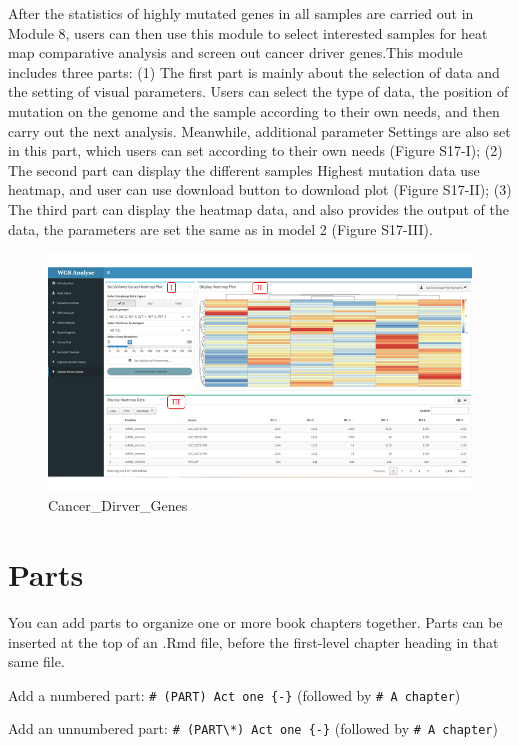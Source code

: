 \documentclass[
]{book}
\theoremstyle{definition}
\theoremstyle{definition}
\theoremstyle{definition}
\theoremstyle{definition}
\theoremstyle{remark}
\begin{document}
After the statistics of highly mutated genes in all samples are carried out in Module 8, users can then use this module to select interested samples for heat map comparative analysis and screen out cancer driver genes.This module includes three parts: (1) The first part is mainly about the selection of data and the setting of visual parameters. Users can select the type of data, the position of mutation on the genome and the sample according to their own needs, and then carry out the next analysis. Meanwhile, additional parameter Settings are also set in this part, which users can set according to their own needs (Figure S17-I); (2) The second part can display the different samples Highest mutation data use heatmap, and user can use download button to download plot (Figure S17-II); (3) The third part can display the heatmap data, and also provides the output of the data, the parameters are set the same as in model 2 (Figure S17-III).

\begin{figure}
\includegraphics[width=1\linewidth]{figure/8.Cancer_Driver_genes_1} \caption{Cancer_Dirver_Genes}\label{fig:unnamed-chunk-20}
\end{figure}

\hypertarget{parts}{%
\chapter{Parts}\label{parts}}

You can add parts to organize one or more book chapters together. Parts can be inserted at the top of an .Rmd file, before the first-level chapter heading in that same file.

Add a numbered part: \texttt{\#\ (PART)\ Act\ one\ \{-\}} (followed by \texttt{\#\ A\ chapter})

Add an unnumbered part: \texttt{\#\ (PART\textbackslash{}*)\ Act\ one\ \{-\}} (followed by \texttt{\#\ A\ chapter})
\end{document}
